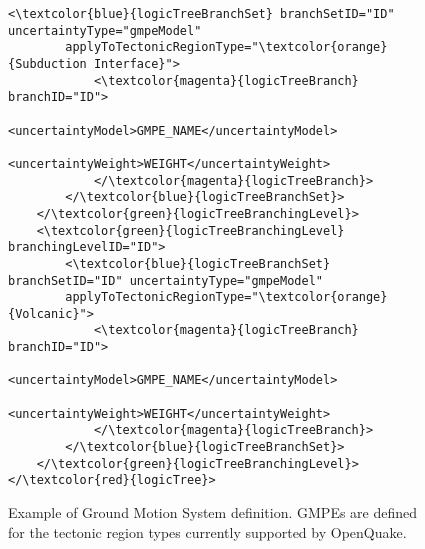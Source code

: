 \begin{figure}[htbp]
\begin{center}
\begin{Verbatim}[frame=single, commandchars=\\\{\},fontsize=\scriptsize, samepage=true]
		<\textcolor{blue}{logicTreeBranchSet} branchSetID="ID" uncertaintyType="gmpeModel" 
		applyToTectonicRegionType="\textcolor{orange}{Subduction Interface}">
			<\textcolor{magenta}{logicTreeBranch} branchID="ID">
				<uncertaintyModel>GMPE_NAME</uncertaintyModel>
				<uncertaintyWeight>WEIGHT</uncertaintyWeight>
			</\textcolor{magenta}{logicTreeBranch}>                
		</\textcolor{blue}{logicTreeBranchSet}>
	</\textcolor{green}{logicTreeBranchingLevel}>
	<\textcolor{green}{logicTreeBranchingLevel} branchingLevelID="ID">
		<\textcolor{blue}{logicTreeBranchSet} branchSetID="ID" uncertaintyType="gmpeModel" 
		applyToTectonicRegionType="\textcolor{orange}{Volcanic}">
			<\textcolor{magenta}{logicTreeBranch} branchID="ID">
				<uncertaintyModel>GMPE_NAME</uncertaintyModel>
				<uncertaintyWeight>WEIGHT</uncertaintyWeight>
			</\textcolor{magenta}{logicTreeBranch}>                
		</\textcolor{blue}{logicTreeBranchSet}>
	</\textcolor{green}{logicTreeBranchingLevel}>           
</\textcolor{red}{logicTree}>
\end{Verbatim}
\caption{Example of Ground Motion System definition. GMPEs are defined for the tectonic region types currently supported by OpenQuake.}
\label{lt2}
\end{center}
\end{figure}

